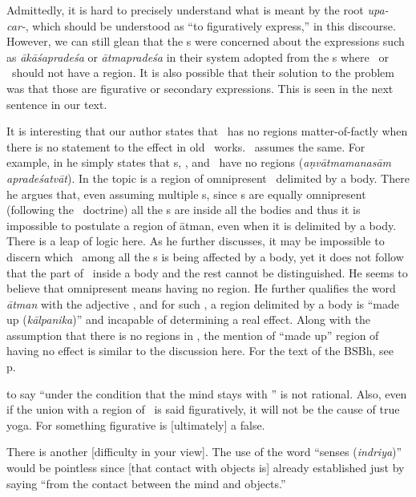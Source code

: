{Admittedly, it is hard to precisely understand what is meant by the root \emph{upa-car-}, which should be understood as ``to figuratively express,'' in this discourse. However, we can still glean that the \Naiyayika s were concerned about the expressions such as \emph{ākāśapradeśa} or \emph{ātmapradeśa} in their system adopted from the \Vaisesika s where \akasa\ or \atman\ should not have a region. It is also possible that their solution to the problem was that those are figurative or secondary expressions. This is seen in the next sentence in our text.

It is interesting that our author states that \atman\ has no regions matter-of-factly when there is no statement to the effect in old \Vaisesika\ works. \Sankara\ assumes the same. For example, in  he simply states that \anu s, \atman, and \manas\ have no regions (\emph{aṇvātmamanasām apradeśatvāt}). In  the topic is a region of omnipresent \atman\ delimited by a body. There he argues that, even assuming multiple \atman s, since \atman s are equally omnipresent (following the \Vaisesika\ doctrine) all the \atman s are inside all the bodies and thus it is impossible to postulate a region of ātman, even when it is delimited by a body. There is a leap of logic here. As he further discusses, it may be impossible to discern which \atman\ among all the \atman s is being affected by a body, yet it does not follow that the part of \atman\ inside a body and the rest cannot be distinguished. He seems to believe that omnipresent means having no region. He further qualifies the word \emph{ātman} with the adjective \nispradesa, and for such \atman, a region delimited by a body is ``made up (\emph{kālpanika})'' and incapable of determining a real effect. Along with the assumption that there is no regions in \atman, the mention of ``made up'' region of having no effect is similar to the discussion here. For the text of the BSBh, see p.~\pageref{BSBHTHREETHREE}} to say  ``under the condition that the mind stays with \atman'' is not rational.  Also, even if the union with a region of \atman\ is said figuratively, it will not be the cause of true yoga.  For something figurative is [ultimately] a false.

There%
 is another [difficulty in your view].  The use of the word ``senses (\emph{indriya})'' would be pointless since [that contact with objects is] already established just by saying ``from the contact between the mind and objects.''

